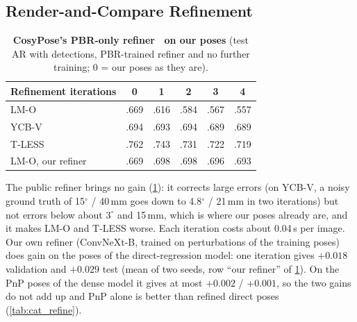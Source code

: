 \subsection{Render-and-Compare Refinement}
\label{sec:acc:refine}
\begin{table}[t]
  \centering
  \small
  \begin{tabular}{@{}lccccc@{}}
    \toprule
    Refinement iterations & 0 & 1 & 2 & 3 & 4 \\
    \midrule
    LM-O  & .669 & .616 & .584 & .567 & .557 \\
    YCB-V & .694 & .693 & .694 & .689 & .689 \\
    T-LESS & .762 & .743 & .731 & .722 & .719 \\
    LM-O, our refiner & .669 & .698 & .698 & .696 & .693 \\
    \bottomrule
  \end{tabular}
  \caption{\textbf{CosyPose's PBR-only refiner~\cite{labbe2020cosypose} on our poses} (test AR
  with detections, PBR-trained refiner and no further training; 0 = our poses as they are).}
  \label{tab:acc_refine}
\end{table}
The public refiner brings no gain (\cref{tab:acc_refine}): it corrects large errors (on YCB-V, a
noisy ground truth of 15$^\circ$ / 40\,mm goes down to 4.8$^\circ$ / 21\,mm in two iterations) but not
errors below about $3^\circ$ and 15\,mm, which is where our poses already are, and it makes LM-O
and T-LESS worse. Each iteration costs about 0.04\,s per image.
Our own refiner (ConvNeXt-B, trained on perturbations of the training poses) does gain on the poses of the
direct-regression model: one iteration gives $+0.018$ validation and $+0.029$ test (mean of two seeds, row
``our refiner'' of \cref{tab:acc_refine}). On the PnP poses of the dense model it gives at most
$+0.002$ / $+0.001$, so the two gains do not add up and PnP alone is better than refined direct
poses (\cref{tab:cat_refine}).
